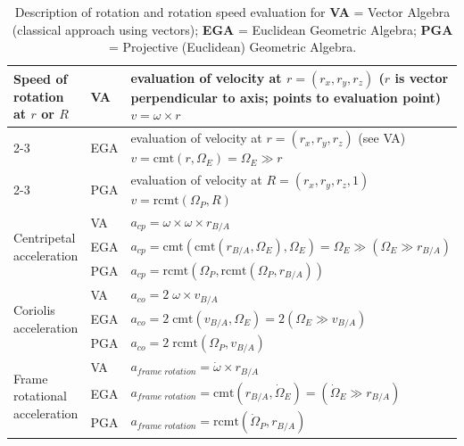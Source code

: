 \begin{table}[H]
{\begin{tabular}{|p{\cwAppPhys}|p{\cwTagPhys}|p{\cwDescPhys}|}
    \hline \hline
    \multirow{3}{\cwAppPhys}{Speed of rotation at $r$ or $R$\newline}
    & VA  & evaluation of velocity at $r = (r_x,r_y,r_z)$
    ($r$ is vector perpendicular to axis; points to evaluation point)\newline
    $v = \omega \times r$  \\
    \cline{2-3}
    & EGA & evaluation of velocity at $r = (r_x,r_y,r_z)$
    (see VA)\newline
    $v = \textrm{cmt}(r, \Omega_{E}) = \Omega_{E} \gg r$ \\
    \cline{2-3}
    & PGA & evaluation of velocity at $R = (r_x,r_y,r_z, 1)$\newline
    $v = \textrm{rcmt}(\Omega_{P}, R)$  \\
    \hline \hline
    \multirow{3}{\cwAppPhys}{Centripetal acceleration}
    & VA  & $a_{cp} = \omega \times \omega \times r_{B/A}$ \\
    \cline{2-3}
    & EGA & $a_{cp} = \textrm{cmt}(\textrm{cmt}(r_{B/A}, \Omega_{E}), \Omega_{E})
     = \Omega_{E} \gg (\Omega_{E} \gg r_{B/A})$ \\
    \cline{2-3}
    & PGA & $a_{cp} = \textrm{rcmt}(\Omega_{P}, \textrm{rcmt}(\Omega_{P},r_{B/A}))$
    \\
    \hline \hline
    \multirow{3}{\cwAppPhys}{Coriolis acceleration}
    & VA  & $a_{co} = 2\; \omega \times v_{B/A}$ \\
    \cline{2-3}
    & EGA & $a_{co} = 2\; \textrm{cmt}(v_{B/A}, \Omega_{E})
     = 2 (\Omega_{E} \gg v_{B/A})$ \\
    \cline{2-3}
    & PGA & $a_{co} = 2\; \textrm{rcmt}(\Omega_{P},v_{B/A})$ \\
    \hline \hline
    \multirow{3}{\cwAppPhys}{Frame rotational acceleration}
    & VA  & $a_{frame \; rotation} = \dot{\omega} \times r_{B/A}$ \\
    \cline{2-3}
    & EGA & $a_{frame \; rotation} = \textrm{cmt}(r_{B/A}, \dot{\Omega}_{E})
     = (\dot{\Omega}_{E} \gg r_{B/A})$ \\
    \cline{2-3}
    & PGA & $a_{frame \; rotation} = \textrm{rcmt}(\dot{\Omega}_{P},r_{B/A})$ \\
    \hline
\end{tabular}}%
\caption{Description of rotation and rotation speed evaluation for \textbf{VA} = Vector
         Algebra (classical approach using vectors); \textbf{EGA} = Euclidean Geometric
         Algebra; \textbf{PGA} = Projective (Euclidean) Geometric Algebra.}
\end{table}

